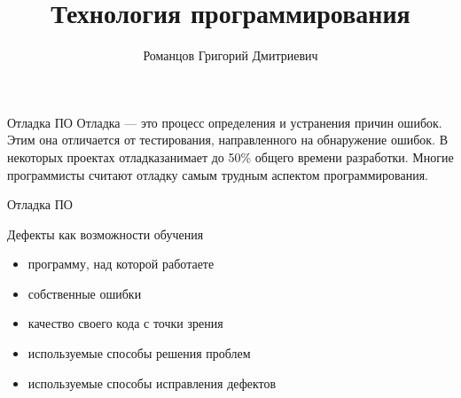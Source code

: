 \documentclass[10pt,pdf,hyperref={unicode}]{beamer}%
\title{Технология программирования}
\author{Романцов Григорий Дмитриевич}
\date{}
\begin{document}

\begin{frame}%
  \titlepage
\end{frame}

\begin{frame}{Отладка ПО}
Отладка — это  процесс  определения  и  устранения  причин ошибок.  Этим  она  отличается  от  тестирования,  направленного на обнаружение ошибок. В
некоторых проектах отладказанимает  до  50\%  общего  времени  разработки. Многие  программисты считают отладку самым трудным аспектом программирования.
\end{frame}

\begin{frame}{Отладка ПО}

  \begin{figure}[h]


  \end{figure}

\end{frame}

\begin{frame}{Дефекты как возможности обучения}

  \begin{itemize}

    \item {  программу,  над  которой  работаете}
    \item { собственные ошибки}
    \item { качество своего кода с точки зрения}
    \item {  используемые  способы  решения  проблем}
    \item { используемые способы исправления дефектов}

  \end{itemize}
\end{frame}
\end{document}
